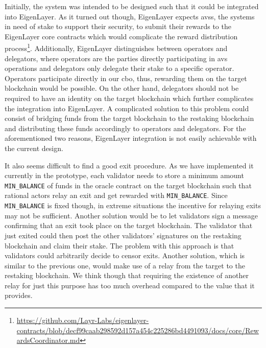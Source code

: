 \documentclass{article}
\begin{document}
	Initially, the system was intended to be designed such that it could be integrated into EigenLayer.
	As it turned out though, EigenLayer expects \glspl{avs}, the systems in need of stake to support their security, to submit their rewards to the EigenLayer core contracts which would complicate the reward distribution process\footnote{\url{https://github.com/Layr-Labs/eigenlayer-contracts/blob/decf99caab298592d157a454c225286bd4491093/docs/core/RewardsCoordinator.md}}.
	Additionally, EigenLayer distinguishes between operators and delegators, where operators are the parties directly participating in \gls{avs} operations and delegators only delegate their stake to a specific operator.
	Operators participate directly in our \gls{cbo}, thus, rewarding them on the target blockchain would be possible.
	On the other hand, delegators should not be required to have an identity on the target blockchain which further complicates the integration into EigenLayer.
	A complicated solution to this problem could consist of bridging funds from the target blockchain to the restaking blockchain and distributing these funds accordingly to operators and delegators.
	For the aforementioned two reasons, EigenLayer integration is not easily achievable with the current design.
	
	It also seems difficult to find a good exit procedure.
	As we have implemented it currently in the prototype, each validator needs to store a minimum amount \texttt{MIN\_BALANCE} of funds in the oracle contract on the target blockchain such that rational actors relay an exit and get rewarded with \texttt{MIN\_BALANCE}.
	Since \texttt{MIN\_BALANCE} is fixed though, in extreme situations the incentive for relaying exits may not be sufficient.
	Another solution would be to let validators sign a message confirming that an exit took place on the target blockchain.
	The validator that just exited could then post the other validators' signatures on the restaking blockchain and claim their stake.
	The problem with this approach is that validators could arbitrarily decide to censor exits.
	Another solution, which is similar to the previous one, would make use of a relay from the target to the restaking blockchain.
	We think though that requiring the existence of another relay for just this purpose has too much overhead compared to the value that it provides.
	
	
	\printbibliography
	\printglossaries
\end{document}
